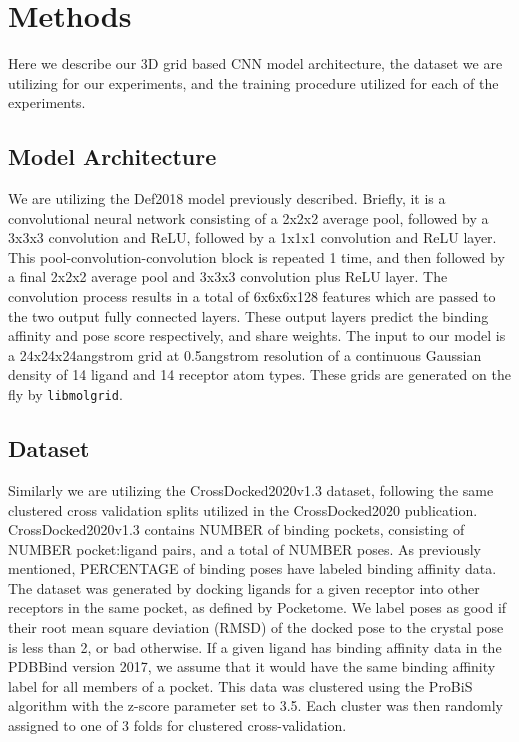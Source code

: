 \documentclass[journal=jmcmar,manuscript=article]{achemso}
\begin{document}
\section{Methods}
Here we describe our 3D grid based CNN model architecture, the dataset we are utilizing for our experiments, and the training procedure utilized for each of the experiments.

\subsection{Model Architecture}
We are utilizing the Def2018 model previously described.\cite{crossdocked2020}
Briefly, it is a convolutional neural network consisting of a 2x2x2 average pool, followed by a 3x3x3 convolution and ReLU, followed by a 1x1x1 convolution and ReLU layer. 
This pool-convolution-convolution block is repeated 1 time, and then followed by a final 2x2x2 average pool and 3x3x3 convolution plus ReLU layer.
The convolution process results in a total of 6x6x6x128 features which are passed to the two output fully connected layers.
These output layers predict the binding affinity and pose score respectively, and share weights.
The input to our model is a 24x24x24angstrom grid at 0.5angstrom resolution of a continuous Gaussian density of 14 ligand and 14 receptor atom types.
These grids are generated on the fly by \texttt{libmolgrid}.\cite{sunseri2019libmolgrid}

\subsection{Dataset}%
Similarly we are utilizing the CrossDocked2020v1.3 dataset, following the same clustered cross validation splits utilized in the CrossDocked2020 publication.\cite{crossdocked2020}
CrossDocked2020v1.3 contains NUMBER of binding pockets, consisting of NUMBER pocket:ligand pairs, and a total of NUMBER poses.
As previously mentioned, PERCENTAGE of binding poses have labeled binding affinity data.
The dataset was generated by docking ligands for a given receptor into other receptors in the same pocket, as defined by Pocketome\cite{pocketome}.
We label poses as good if their root mean square deviation (RMSD) of the docked pose to the crystal pose is less than 2, or bad otherwise.
If a given ligand has binding affinity data in the PDBBind version 2017, we assume that it would have the same binding affinity label for all members of a pocket.
This data was clustered using the ProBiS \cite{ProBiS} algorithm with the z-score parameter set to 3.5.
Each cluster was then randomly assigned to one of 3 folds for clustered cross-validation.
\end{document}
